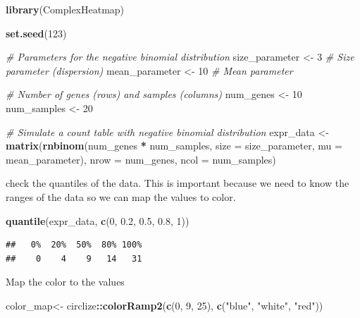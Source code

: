 \documentclass[
]{book}
\newenvironment{Shaded}{\begin{snugshade}}{\end{snugshade}}
\newcommand{\AttributeTok}[1]{\textcolor[rgb]{0.13,0.29,0.53}{#1}}
\newcommand{\CommentTok}[1]{\textcolor[rgb]{0.56,0.35,0.01}{\textit{#1}}}
\newcommand{\DecValTok}[1]{\textcolor[rgb]{0.00,0.00,0.81}{#1}}
\newcommand{\FloatTok}[1]{\textcolor[rgb]{0.00,0.00,0.81}{#1}}
\newcommand{\FunctionTok}[1]{\textcolor[rgb]{0.13,0.29,0.53}{\textbf{#1}}}
\newcommand{\NormalTok}[1]{#1}
\newcommand{\OtherTok}[1]{\textcolor[rgb]{0.56,0.35,0.01}{#1}}
\newcommand{\SpecialCharTok}[1]{\textcolor[rgb]{0.81,0.36,0.00}{\textbf{#1}}}
\newcommand{\StringTok}[1]{\textcolor[rgb]{0.31,0.60,0.02}{#1}}
\begin{document}
\begin{Shaded}
\begin{Highlighting}[]
\FunctionTok{library}\NormalTok{(ComplexHeatmap)}

\FunctionTok{set.seed}\NormalTok{(}\DecValTok{123}\NormalTok{)}

\CommentTok{\# Parameters for the negative binomial distribution}
\NormalTok{size\_parameter }\OtherTok{\textless{}{-}} \DecValTok{3} \CommentTok{\# Size parameter (dispersion)}
\NormalTok{mean\_parameter }\OtherTok{\textless{}{-}} \DecValTok{10}  \CommentTok{\# Mean parameter}

\CommentTok{\# Number of genes (rows) and samples (columns)}
\NormalTok{num\_genes }\OtherTok{\textless{}{-}} \DecValTok{10}
\NormalTok{num\_samples }\OtherTok{\textless{}{-}} \DecValTok{20}

\CommentTok{\# Simulate a count table with negative binomial distribution}
\NormalTok{expr\_data }\OtherTok{\textless{}{-}} \FunctionTok{matrix}\NormalTok{(}\FunctionTok{rnbinom}\NormalTok{(num\_genes }\SpecialCharTok{*}\NormalTok{ num\_samples, }
                            \AttributeTok{size =}\NormalTok{ size\_parameter, }
                            \AttributeTok{mu =}\NormalTok{ mean\_parameter), }
                    \AttributeTok{nrow =}\NormalTok{ num\_genes, }
                    \AttributeTok{ncol =}\NormalTok{ num\_samples)}
\end{Highlighting}
\end{Shaded}

check the quantiles of the data. This is important because we need to know the
ranges of the data so we can map the values to color.

\begin{Shaded}
\begin{Highlighting}[]
\FunctionTok{quantile}\NormalTok{(expr\_data, }\FunctionTok{c}\NormalTok{(}\DecValTok{0}\NormalTok{, }\FloatTok{0.2}\NormalTok{, }\FloatTok{0.5}\NormalTok{, }\FloatTok{0.8}\NormalTok{, }\DecValTok{1}\NormalTok{))}
\end{Highlighting}
\end{Shaded}

\begin{verbatim}
##   0%  20%  50%  80% 100% 
##    0    4    9   14   31
\end{verbatim}

Map the color to the values

\begin{Shaded}
\begin{Highlighting}[]
\NormalTok{color\_map}\OtherTok{\textless{}{-}}\NormalTok{ circlize}\SpecialCharTok{::}\FunctionTok{colorRamp2}\NormalTok{(}\FunctionTok{c}\NormalTok{(}\DecValTok{0}\NormalTok{, }\DecValTok{9}\NormalTok{, }\DecValTok{25}\NormalTok{), }\FunctionTok{c}\NormalTok{(}\StringTok{"blue"}\NormalTok{, }\StringTok{"white"}\NormalTok{, }\StringTok{"red"}\NormalTok{))}
\end{Highlighting}
\end{Shaded}
\end{document}
